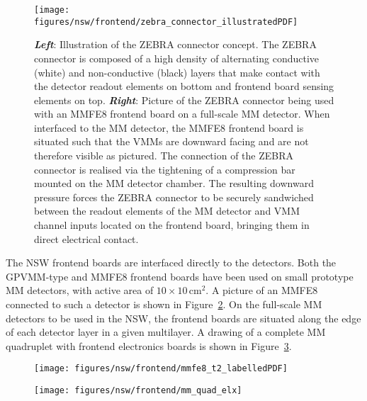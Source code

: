 \begin{figure}[!htb]
    \begin{center}
        \texttt{[image: figures/nsw/frontend/zebra\_connector\_illustratedPDF]}
        \caption{
            \textbf{\textit{Left}}: Illustration of the ZEBRA connector concept.
                The ZEBRA connector is composed of a high density of alternating conductive (white) and non-conductive (black) layers
                that make contact with the detector readout elements on bottom and frontend board sensing elements
                on top.
            \textbf{\textit{Right}}: Picture of the ZEBRA connector being used with an MMFE8 frontend board
                on a full-scale MM detector.
                When interfaced to the MM detector, the MMFE8 frontend board is situated such that the VMMs are downward facing and
                are not therefore visible as pictured.
                The connection of the ZEBRA connector is realised via the tightening of a compression bar mounted on the MM detector chamber.
                The resulting
                downward pressure forces the ZEBRA connector to be securely sandwiched between
                the readout elements of the MM detector and VMM channel inputs located on the frontend board, bringing them in direct electrical contact.
        }
        \label{fig:zebra_connector}
    \end{center}
\end{figure}

The NSW frontend boards are interfaced directly to the detectors.
Both the GPVMM-type and MMFE8 frontend boards have been used on small prototype MM detectors, with
active area of $10\times10$\,cm$^2$.
A picture of an MMFE8 connected to such a detector is shown in Figure~\ref{fig:mmfe8_t2}.
On the full-scale MM detectors to be used in the NSW, the frontend boards are situated along the edge
of each detector layer in a given multilayer.
A drawing of a complete MM quadruplet with frontend electronics boards is shown in Figure~\ref{fig:mm_quad_elx}.


\begin{figure}[!htb]
    \begin{center}
        \texttt{[image: figures/nsw/frontend/mmfe8\_t2\_labelledPDF]}
        \caption{
        }
        \label{fig:mmfe8_t2}
    \end{center}
\end{figure}

\begin{figure}[!htb]
    \begin{center}
        \texttt{[image: figures/nsw/frontend/mm\_quad\_elx]}
        \caption{
            {\color{red}{Explain how the frontend boards are situated on the NSW chambers}}
        }
        \label{fig:mm_quad_elx}
    \end{center}
\end{figure}
